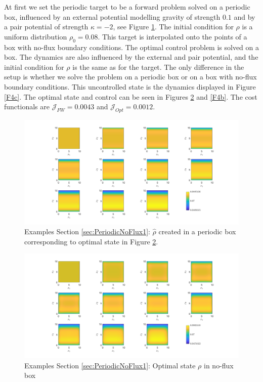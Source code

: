 \documentclass[11pt, a4paper]{article}
\theoremstyle{definition}
\newcommand{\hr}{\widehat \rho}
\begin{document}
At first we set the periodic target to be a forward problem solved on a periodic box, influenced by an external potential modelling gravity of strength $0.1$ and by a pair potential of strength $\kappa = -2$, see Figure \ref{F4}. The initial condition for $\rho$ is a uniform distribution $\rho_0 = 0.08$. 
This target is interpolated onto the points of a box with no-flux boundary conditions. The optimal control problem is solved on a box. The dynamics are also influenced by the external and pair potential, and the initial condition for $\rho$ is the same as for the target. The only difference in the setup is whether we solve the problem on a periodic box or on a box with no-flux boundary conditions. This uncontrolled state is the dynamics displayed in Figure \ref{F4c}. The optimal state and control can be seen in Figures \ref{F4a} and \ref{F4b}. The cost functionals are $\mathcal J_{FW} = 0.0043$ and $\mathcal J_{Opt} = 0.0012$.

\begin{figure}[h]
	\centering
	\includegraphics[scale=0.35]{rhoHatPeri1.png}
	\caption{Examples Section \ref{sec:PeriodicNoFlux1}: $\hr$ created in a periodic box corresponding to optimal state in Figure \ref{F4a}.} 
	\label{F4}
\end{figure}
\begin{figure}[h]
	\centering
	\includegraphics[scale=0.35]{rhoOptPeri1.png}
	\caption{Examples Section \ref{sec:PeriodicNoFlux1}: Optimal state $\rho$ in no-flux box} 
	\label{F4a}
\end{figure}
\end{document}
